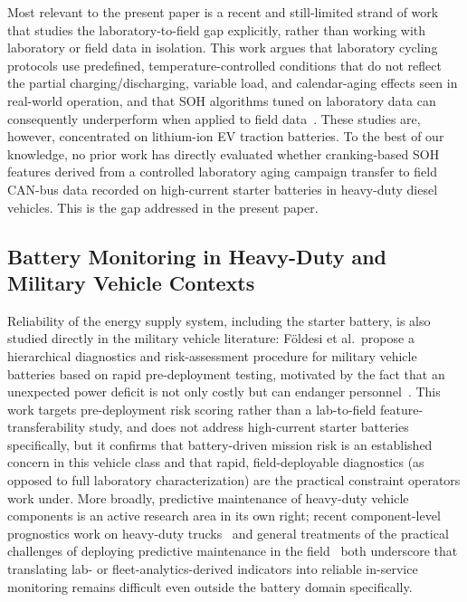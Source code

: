 \documentclass[conference]{IEEEtran}
\begin{document}
Most relevant to the present paper is a recent and still-limited strand of work that studies the laboratory-to-field gap explicitly, rather than working with laboratory or field data in isolation. This work argues that laboratory cycling protocols use predefined, temperature-controlled conditions that do not reflect the partial charging/discharging, variable load, and calendar-aging effects seen in real-world operation, and that SOH algorithms tuned on laboratory data can consequently underperform when applied to field data~\cite{labfield_gap,transferable_capacity_estimation}. These studies are, however, concentrated on lithium-ion EV traction batteries. To the best of our knowledge, no prior work has directly evaluated whether cranking-based SOH features derived from a controlled laboratory aging campaign transfer to field CAN-bus data recorded on high-current starter batteries in heavy-duty diesel vehicles. This is the gap addressed in the present paper.

\subsection{Battery Monitoring in Heavy-Duty and Military Vehicle Contexts}

Reliability of the energy supply system, including the starter battery, is also studied directly in the military vehicle literature: Földesi et al.\ propose a hierarchical diagnostics and risk-assessment procedure for military vehicle batteries based on rapid pre-deployment testing, motivated by the fact that an unexpected power deficit is not only costly but can endanger personnel~\cite{foldesiHierarchicalDiagnosticsRisk2022}. This work targets pre-deployment risk scoring rather than a lab-to-field feature-transferability study, and does not address high-current starter batteries specifically, but it confirms that battery-driven mission risk is an established concern in this vehicle class and that rapid, field-deployable diagnostics (as opposed to full laboratory characterization) are the practical constraint operators work under. More broadly, predictive maintenance of heavy-duty vehicle components is an active research area in its own right; recent component-level prognostics work on heavy-duty trucks~\cite{dimidovEmpiricalStudyPredictive2025} and general treatments of the practical challenges of deploying predictive maintenance in the field~\cite{tingaPracticalApplicationPredictive2025} both underscore that translating lab- or fleet-analytics-derived indicators into reliable in-service monitoring remains difficult even outside the battery domain specifically.
\end{document}
